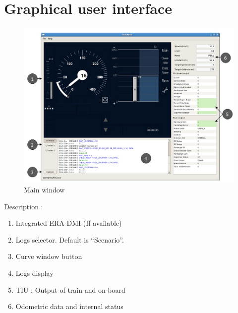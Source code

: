 \section{Graphical user interface}
\begin{figure}[h]
  \centering
  \includegraphics[width=\textwidth]{image/test_runner_GUI.jpg}
  \caption{Main window}
  \label{fig:Main window}
\end{figure}
Description :
\begin{enumerate}
\item Integrated ERA DMI (If available)
\item Logs selector. Default is “Scenario”.
\item Curve window button
\item Logs display
\item TIU : Output of train and on-board
\item Odometric data and internal status
\end{enumerate}
\newpage
